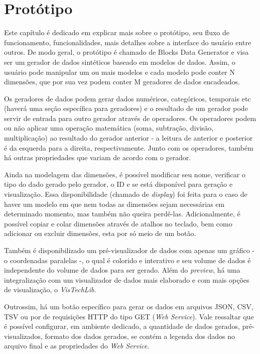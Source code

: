 \documentclass[
	12pt,				%
	openright,			%
	twoside,			%
	a4paper,			%
	english,			%
	brazil				%
	]{abntex2}
\begin{document}
\chapter{Protótipo}
	Este capítulo é dedicado em explicar mais sobre o protótipo, seu fluxo de funcionamento, funcionalidades, mais detalhes sobre a interface do usuário entre outros.
	De modo geral, o protótipo é chamado de Blocks Data Generator e visa ser um gerador de dados sintéticos baseado em modelos de dados.
	Assim, o usuário pode manipular um ou mais modelos e cada modelo pode conter N dimensões, que por sua vez podem conter M geradores de dados encadeados.
	\par
	Os geradores de dados podem gerar dados numéricos, categóricos, temporais etc (haverá uma seção específica para geradores) e o resultado de um gerador pode servir de entrada para outro gerador através de operadores.
	Os operadores podem ou não aplicar uma operação matemática (soma, subtração, divisão, multiplicação) ao resultado do gerador anterior - a leitura de anterior e posterior é da esquerda para a direita, respectivamente.
	Junto com os operadores, também há outras propriedades que variam de acordo com o gerador.
	\par
	Ainda na modelagem das dimensões, é possível modificar seu nome, verificar o tipo do dado gerado pelo gerador, o ID e se está disponível para geração e visualização.
	Essa disponibilidade (chamado de \emph{display}) foi feita para o caso de haver um modelo em que nem todas as dimensões sejam necessárias em determinado momento, mas também não queira perdê-las.
	Adicionalmente, é possível copiar e colar dimensões através de atalhos no teclado, bem como adicionar ou excluir dimensões, esta por só meio de um botão.
	\par
	Também é disponibilizado um pré-visualizador de dados com apenas um gráfico - o coordenadas paralelas -, o qual é colorido e interativo e seu volume de dados é independente do volume de dados para ser gerado.
	Além do \emph{preview}, há uma integralização com um visualizador de dados mais elaborado e com mais opções de visualização, o \emph{VisTechLib}.
	\par
	Outrossim, há um botão específico para gerar os dados em arquivos JSON, CSV, TSV ou por de requisições HTTP do tipo GET (\emph{Web Service}).
	Vale ressaltar que é possível configurar, em ambiente dedicado, a quantidade de dados gerados, pré-visualizados, formato dos dados gerados, se contém a legenda dos dados no arquivo final e as propriedades do \emph{Web Service}.
\end{document}
